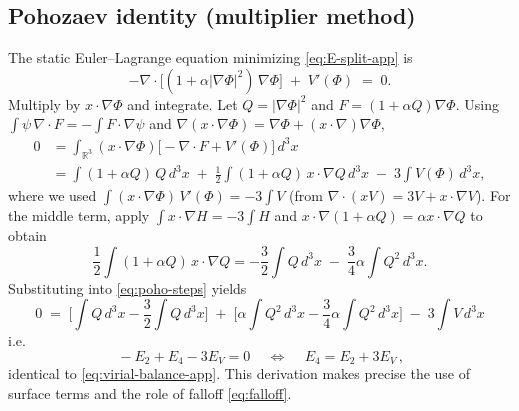 \documentclass{article}
\begin{document}
\subsection{Pohozaev identity (multiplier method)}
\label{app:pohozaev}
The static Euler–Lagrange equation minimizing \eqref{eq:E-split-app} is
\begin{equation}
-\nabla\!\cdot\!\Big[(1+\alpha|\nabla\Phi|^2)\,\nabla\Phi\Big] \;+\; V'(\Phi) \;=\; 0.
\label{eq:static-EOM}
\end{equation}
Multiply by $x\!\cdot\!\nabla\Phi$ and integrate. Let $Q=|\nabla\Phi|^2$ and $F=(1+\alpha Q)\nabla\Phi$.
Using $\int \psi\,\nabla\!\cdot F=-\int F\!\cdot\!\nabla\psi$ and $\nabla(x\!\cdot\!\nabla\Phi)=\nabla\Phi+(x\!\cdot\!\nabla)\nabla\Phi$,
\begin{align}
0&=\int_{\mathbb{R}^3} (x\!\cdot\!\nabla\Phi)\Big[-\nabla\!\cdot F + V'(\Phi)\Big]\,d^3x \nonumber\\
&=\int (1+\alpha Q)\,Q\,d^3x \;+\; \frac{1}{2}\int (1+\alpha Q)\,x\!\cdot\!\nabla Q\,d^3x \;-\; 3\int V(\Phi)\,d^3x, \label{eq:poho-steps}
\end{align}
where we used $\int (x\!\cdot\!\nabla\Phi)\,V'(\Phi)= -3\int V$ (from $\nabla\!\cdot(x V)=3V+x\!\cdot\!\nabla V$).
For the middle term, apply $\int x\!\cdot\!\nabla H=-3\int H$ and $x\!\cdot\!\nabla(1+\alpha Q)=\alpha x\!\cdot\!\nabla Q$ to obtain
\[
\frac{1}{2}\!\int\!(1+\alpha Q)\,x\!\cdot\!\nabla Q
= -\frac{3}{2}\!\int\!Q\,d^3x \;-\; \frac{3}{4}\alpha\!\int\!Q^2\,d^3x.
\]
Substituting into \eqref{eq:poho-steps} yields
\[
0 \;=\; \Big[\int Q\,d^3x - \frac{3}{2}\!\int Q\,d^3x\Big] \;+\; \Big[\alpha\!\int Q^2\,d^3x - \frac{3}{4}\alpha\!\int Q^2\,d^3x\Big] \;-\; 3\!\int V\,d^3x
\]
i.e.
\begin{equation}
\boxed{\, -E_2 + E_4 - 3E_V = 0 \,}\quad\Longleftrightarrow\quad \boxed{\,E_4=E_2+3E_V\,},
\label{eq:poho-identity}
\end{equation}
identical to \eqref{eq:virial-balance-app}. This derivation makes precise the use of surface terms and the role of falloff \eqref{eq:falloff}.
\end{document}
